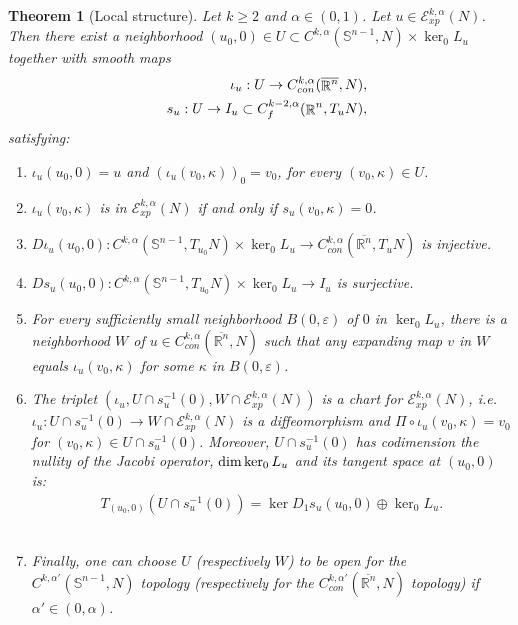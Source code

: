 \documentclass[a4paper,11pt,reqno]{amsart}
\newtheorem{theo}[defn]{Theorem}
\def\dim{\mathop{\rm dim}\nolimits}
\def\dim{\mathop{\rm dim}\nolimits}
\def\R{\mathop{\rm \mathbb{R}}\nolimits}
\newcommand{\Ent}{\mathcal{E}}
\begin{document}
\begin{theo}[Local structure]\label{loc-str}
Let $k\geq 2$ and $\alpha\in(0,1)$. Let $u\in\Ent_{xp}^{k,\alpha}(N)$. Then there exist a neighborhood $(u_0,0)\in U\subset C^{k,\alpha}(\mathbb{S}^{n-1},N)\times \ker_0L_u$ together with smooth maps 
\begin{eqnarray*}
&&\iota_u:U\rightarrow C_{con}^{k,\alpha}(\overline{\R^n},N),\\
&&s_u:U\rightarrow I_u\subset C_f^{k-2,\alpha}(\R^n,T_uN),
\end{eqnarray*}
 satisfying:
 \begin{enumerate}
 \item \label{item-str-inf-iota}$\iota_u(u_0,0)=u$ and $(\iota_u(v_0,\kappa))_0=v_0$, for every $(v_0,\kappa)\in U$.\\
 \item $\iota_u(v_0,\kappa)$ is in $\Ent_{xp}^{k,\alpha}(N)$ if and only if $s_u(v_0,\kappa)=0$.\\
 \item \label{item-inj} $D\iota_u(u_0,0):C^{k,\alpha}(\mathbb{S}^{n-1},T_{u_0}N)\times\ker_0L_u\rightarrow C^{k,\alpha}_{con}(\overline{\mathbb{R}^n},T_uN)$ is injective. \\ 
 \item \label{item-surj}
 $Ds_u(u_0,0):C^{k,\alpha}(\mathbb{S}^{n-1},T_{u_0}N)\times\ker_0L_u\rightarrow I_u$ is surjective.\\
 \item \label{item-unique-exp} For every sufficiently small neighborhood $B(0,\varepsilon)$ of $0$ in $\ker_0L_u$, there is a neighborhood $W$ of $u\in C^{k,\alpha}_{con}(\overline{\mathbb{R}^n},N)$ such that any expanding map $v$ in $W$ equals $\iota_u(v_0,\kappa)$ for some $\kappa$ in $B(0,\varepsilon)$.\\
 
 \item \label{item-chart}The triplet $(\iota_u,U\cap s_u^{-1}(0),W\cap \Ent_{xp}^{k,\alpha}(N))$ is a chart for $\Ent_{xp}^{k,\alpha}(N)$, i.e.\\
 $\iota_u:U\cap s_u^{-1}(0)\rightarrow W\cap \Ent_{xp}^{k,\alpha}(N)$ is a diffeomorphism and $\Pi\circ \iota_u(v_0,\kappa)=v_0$ for $(v_0,\kappa)\in U\cap s_u^{-1}(0)$. Moreover, $U\cap s_u^{-1}(0)$ has codimension the nullity of the Jacobi operator, $\dim \ker_0L_u$ and its tangent space at $(u_0,0)$ is:
 \begin{eqnarray}
 T_{(u_0,0)}\left(U\cap s_u^{-1}(0)\right)=\ker D_1s_u(u_0,0)\oplus\ker_0L_u.\label{split-tan-space}
 \end{eqnarray}
 \\
 
 \item \label{item-second-count}Finally, one can choose $U$ (respectively $W$) to be open for the $C^{k,\alpha'}(\mathbb{S}^{n-1},N)$  topology (respectively for the $C_{con}^{k,\alpha'}(\overline{\mathbb{R}^{n}},N)$  topology) if $\alpha'\in(0,\alpha)$.
 
 
 \end{enumerate}


\end{theo}
\end{document}
